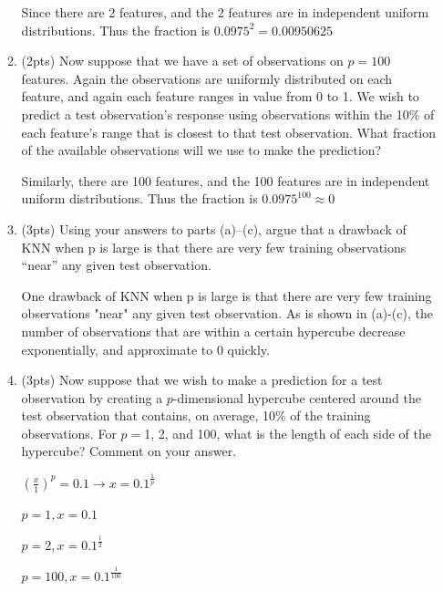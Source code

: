 \documentclass[a4paper]{article}
\theoremstyle{definition}
\newenvironment{soln}{
    \leavevmode\color{blue}\ignorespaces
}{}
\begin{document}
\begin{enumerate}
\begin{enumerate}
	\begin{soln} Since there are 2 features, and the 2 features are in independent uniform distributions. Thus the fraction is $0.0975^2 = 0.00950625$ \end{soln}
	
	\item (2pts) Now suppose that we have a set of observations on $p = 100$ features. Again the observations are uniformly distributed on each feature, and again each feature ranges in value from 0 to 1. We wish to predict a test observation’s response using observations within the 10\% of each feature’s range that is closest to that test observation. What fraction of the available observations will we use to make the prediction?
	
	\begin{soln} Similarly, there are 100 features, and the 100 features are in independent uniform distributions. Thus the fraction is $0.0975^{100} \approx 0 $\end{soln}
	
	\item (3pts) Using your answers to parts (a)–(c), argue that a drawback of KNN when p is large is that there are very few training observations “near” any given test observation.
	
	\begin{soln}  One drawback of KNN when p is large is that there are very few training observations "near" any given test observation. As is shown in (a)-(c), the number of observations that are within a certain hypercube decrease exponentially, and approximate to 0 quickly. \end{soln}
	
	\item (3pts) Now suppose that we wish to make a prediction for a test observation by creating a $p$-dimensional hypercube centered around the test observation that contains, on average, 10\% of the training observations. For $p =$1, 2, and 100, what is the length of each side of the hypercube? Comment on your answer.
	
	\begin{soln}
 $(\frac{x}{1})^p = 0.1 \rightarrow x=0.1^{\frac{1}{p}}$ 

 $p=1, x=0.1$
 
 $p=2, x=0.1^{\frac{1}{2}}$
 
 $p=100, x=0.1^{\frac{1}{100}}$
 \end{soln}
	
\end{enumerate}


\end{enumerate}
\end{document}
